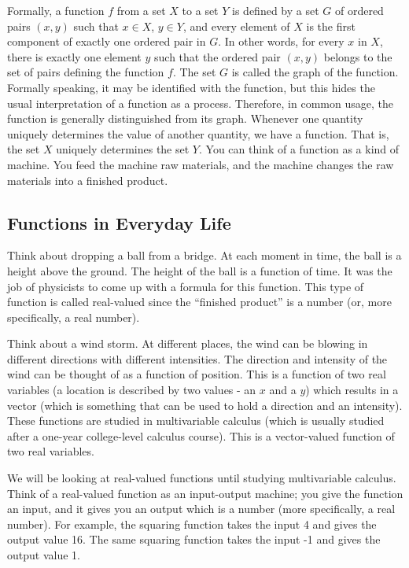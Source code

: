 Formally, a function $f$ from a set $X$ to a set $Y$ is defined by a set $G$ of ordered pairs $(x, y)$ such that $x \in X$, $y \in Y$, and every element of $X$ is the first component of exactly one ordered pair in $G$. In other words, for every $x$ in $X$, there is exactly one element $y$ such that the ordered pair $(x, y)$ belongs to the set of pairs defining the function $f$. The set $G$ is called the graph of the function. Formally speaking, it may be identified with the function, but this hides the usual interpretation of a function as a process. Therefore, in common usage, the function is generally distinguished from its graph. Whenever one quantity uniquely determines the value of another quantity, we have a function. That is, the set $X$ uniquely determines the set $Y$. You can think of a function as a kind of machine. You feed the machine raw materials, and the machine changes the raw materials into a finished product.

\subsection{Functions in Everyday Life}
\label{sss:func-5465}

Think about dropping a ball from a bridge. At each moment in time, the ball is a height
above the ground. The height of the ball is a function of time. It was the job of
physicists to come up with a formula for this function. This type of function is called
real-valued since the ``finished product'' is a number (or, more specifically, a real
number).

Think about a wind storm. At different places, the wind can be blowing in different directions with different intensities. The direction and intensity of the wind can be thought of as a function of position. This is a function of two real variables (a location is described by two values - an $x$ and a $y$) which results in a vector (which is something that can be used to hold a direction and an intensity). These functions are studied in multivariable calculus (which is usually studied after a one-year college-level calculus course). This is a vector-valued function of two real variables.

We will be looking at real-valued functions until studying multivariable calculus. Think
of a real-valued function as an input-output machine; you give the function an input, and
it gives you an output which is a number (more specifically, a real number). For example,
the squaring function takes the input 4 and gives the output value 16. The same squaring
function takes the input -1 and gives the output value 1.

